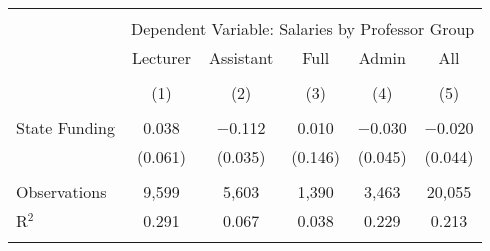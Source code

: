 
\begin{tabular}{@{\extracolsep{5pt}}lccccc} 
\\[-1.8ex]\hline 
\hline \\[-1.8ex] 
 & \multicolumn{5}{c}{Dependent Variable: Salaries by Professor Group} \\ 
\cline{2-6} 
 & Lecturer & Assistant & Full & Admin & All \\ 
\\[-1.8ex] & (1) & (2) & (3) & (4) & (5)\\ 
\hline \\[-1.8ex] 
 State Funding & 0.038 & $-$0.112 & 0.010 & $-$0.030 & $-$0.020 \\ 
  & (0.061) & (0.035) & (0.146) & (0.045) & (0.044) \\ 
 \hline \\[-1.8ex] 
Observations & 9,599 & 5,603 & 1,390 & 3,463 & 20,055 \\ 
R$^{2}$ & 0.291 & 0.067 & 0.038 & 0.229 & 0.213 \\ 
\hline 
\hline \\[-1.8ex] 
\end{tabular} 
